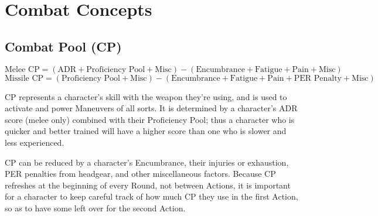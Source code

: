 \documentclass[oneside,11pt,english]{book}
\begin{document}
\section{Combat Concepts}
\subsection{Combat Pool (CP)}
\[\text{Melee CP} = (\text{ADR} + \text{Proficiency Pool} + \text{Misc}) - (\text{Encumbrance}+\text{Fatigue}+\text{Pain}+\text{Misc}) \]
\[\text{Missile CP} = (\text{Proficiency Pool} + \text{Misc})-(\text{Encumbrance} + \text{Fatigue} + \text{Pain} + \text{PER Penalty}+ \text{Misc}) \]

CP represents a character's skill with the weapon they’re using, and is used to activate and power
Maneuvers of all sorts. It is determined by a character's ADR score (melee only) combined with their Proficiency Pool; thus a character who is quicker and better trained will have a higher score than one who is slower and less experienced.

CP can be reduced by a character's Encumbrance, their injuries or exhaustion, PER penalties from %
headgear, and other miscellaneous factors. Because CP refreshes at the beginning of every Round, not
between Actions, it is important for a character to keep careful track of how much CP they use in the first Action, so as to have some left over for the second Action.
\end{document}
